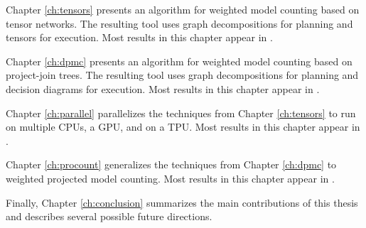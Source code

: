 Chapter \ref{ch:tensors} presents an algorithm for weighted model counting based on tensor networks. The resulting tool  uses graph decompositions for planning and tensors for execution. Most results in this chapter appear in \cite{DDV19}.

Chapter \ref{ch:dpmc} presents an algorithm for weighted model counting based on project-join trees. The resulting tool  uses graph decompositions for planning and decision diagrams for execution. Most results in this chapter appear in \cite{dudek2020dpmc}.

Chapter \ref{ch:parallel} parallelizes the techniques from Chapter \ref{ch:tensors} to run on multiple CPUs, a GPU, and on a TPU. Most results in this chapter appear in \cite{dudek2020parallel}.

Chapter \ref{ch:procount} generalizes the techniques from Chapter \ref{ch:dpmc} to weighted projected model counting. Most results in this chapter appear in \cite{dudek2020procount}.

Finally, Chapter \ref{ch:conclusion} summarizes the main contributions of this thesis and describes several possible future directions.
